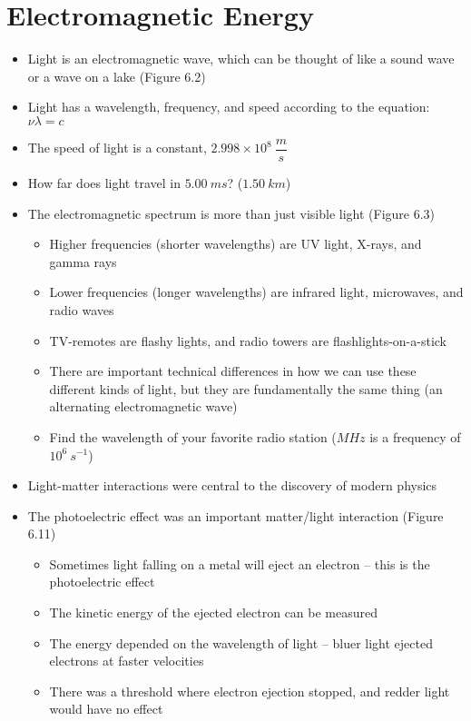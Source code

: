 \documentclass[12pt, openany, letterpaper]{memoir}
\begin{document}
\section{Electromagnetic Energy}
\begin{itemize}
	\item Light is an electromagnetic wave, which can be thought of like a sound wave or a wave on a lake (Figure 6.2)
	\item Light has a wavelength, frequency, and speed according to the equation: $\nu\lambda=c$
	\item The speed of light is a constant, $2.998\times10^8~\dfrac{m}{s}$
	\item How far does light travel in $5.00~ms$? ($1.50~km$)
	\item The electromagnetic spectrum is more than just visible light (Figure 6.3)
	      \begin{itemize}
		      \item Higher frequencies (shorter wavelengths) are UV light, X-rays, and gamma rays
		      \item Lower frequencies (longer wavelengths) are infrared light, microwaves, and radio waves
		      \item TV-remotes are flashy lights, and radio towers are flashlights-on-a-stick
		      \item There are important technical differences in how we can use these different kinds of light, but they are fundamentally the same thing (an alternating electromagnetic wave)
		      \item Find the wavelength of your favorite radio station ($M\!H\!z$ is a frequency of $10^6~s^{-1}$)
	      \end{itemize}
	\item Light-matter interactions were central to the discovery of modern physics
	\item The photoelectric effect was an important matter/light interaction (Figure 6.11)
	      \begin{itemize}
		      \item Sometimes light falling on a metal will eject an electron -- this is the photoelectric effect
		      \item The kinetic energy of the ejected electron can be measured
		      \item The energy depended on the wavelength of light -- bluer light ejected electrons at faster velocities
		      \item There was a threshold where electron ejection stopped, and redder light would have no effect

\end{itemize}
\end{itemize}
\end{document}
